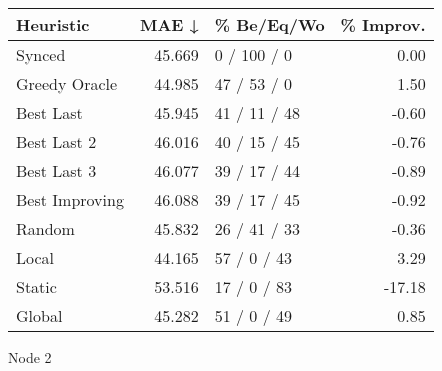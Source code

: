 \begin{tabular}{lrlr}
\toprule
\textbf{Heuristic} & \textbf{MAE ↓} & \textbf{\% Be/Eq/Wo} & \textbf{\% Improv.} \\
\midrule
            Synced &         45.669 &          0 / 100 / 0 &                0.00 \\
     Greedy Oracle &         44.985 &          47 / 53 / 0 &                1.50 \\
         Best Last &         45.945 &         41 / 11 / 48 &               -0.60 \\
       Best Last 2 &         46.016 &         40 / 15 / 45 &               -0.76 \\
       Best Last 3 &         46.077 &         39 / 17 / 44 &               -0.89 \\
    Best Improving &         46.088 &         39 / 17 / 45 &               -0.92 \\
            Random &         45.832 &         26 / 41 / 33 &               -0.36 \\
             Local &         44.165 &          57 / 0 / 43 &                3.29 \\
            Static &         53.516 &          17 / 0 / 83 &              -17.18 \\
            Global &         45.282 &          51 / 0 / 49 &                0.85 \\
\bottomrule
\end{tabular}
\caption{Node 2}
\label{tab:non_lr05_le1_bs2_2}
